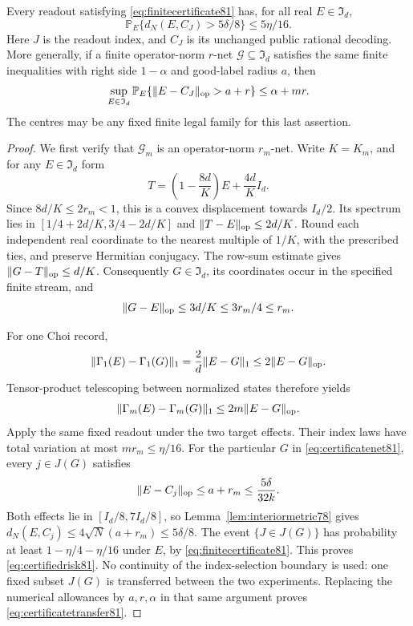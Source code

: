 \begin{theorem}
\label{thm:finitecertificate81}
Every readout satisfying \eqref{eq:finitecertificate81} has, for all
real $E\in\mathfrak I_d$,
\begin{equation}\label{eq:certifiedrisk81}
 \mathbb P_E\{d_N(E,C_J)>5\delta/8\}\le5\eta/16.
\end{equation}
Here $J$ is the readout index, and $C_J$ is its unchanged public
rational decoding.  More generally, if a finite operator-norm $r$-net
$\mathcal G\subseteq\mathfrak I_d$ satisfies the same finite inequalities with right side
$1-\alpha$ and good-label radius $a$, then
\begin{equation}\label{eq:certificatetransfer81}
 \sup_{E\in\mathfrak I_d}\mathbb P_E\{\|E-C_J\|_{\rm op}>a+r\}
 \le\alpha+mr.
\end{equation}
The centres may be any fixed finite legal family for this last assertion.
\end{theorem}
\begin{proof}
We first verify that $\mathcal G_m$ is an operator-norm $r_m$-net.
Write $K=K_m$, and for any $E\in\mathfrak I_d$ form
\[
 T=\left(1-\frac{8d}{K}\right)E+\frac{4d}{K}I_d.
\]
Since $8d/K\le2r_m<1$, this is a convex displacement towards
$I_d/2$.  Its spectrum lies in
$[1/4+2d/K,3/4-2d/K]$ and
$\|T-E\|_{\rm op}\le2d/K$.
Round each independent real coordinate to the nearest multiple of
$1/K$, with the prescribed ties, and preserve Hermitian conjugacy.
The row-sum estimate gives $\|G-T\|_{\rm op}\le d/K$.
Consequently $G\in\mathfrak I_d$, its coordinates occur in the
specified finite stream, and
\begin{equation}\label{eq:certificatenet81}
 \|G-E\|_{\rm op}\le3d/K\le3r_m/4\le r_m.
\end{equation}

For one Choi record,
\[
 \|\Gamma_1(E)-\Gamma_1(G)\|_1
   =\frac{2}{d}\|E-G\|_1\le2\|E-G\|_{\rm op}.
\]
Tensor-product telescoping between normalized states therefore yields
\begin{equation}\label{eq:recordlipschitz81}
 \|\Gamma_m(E)-\Gamma_m(G)\|_1
 \le2m\|E-G\|_{\rm op}.
\end{equation}
Apply the same fixed readout under the two target effects.
Their index laws have total variation at most $mr_m\le\eta/16$.
For the particular $G$ in \eqref{eq:certificatenet81}, every
$j\in J(G)$ satisfies
\[
 \|E-C_j\|_{\rm op}\le a+r_m
                  \le\frac{5\delta}{32k}.
\]
Both effects lie in $[I_d/8,7I_d/8]$, so
Lemma~\ref{lem:interiormetric78} gives
$d_N(E,C_j)\le4\sqrt N(a+r_m)\le5\delta/8$.
The event $\{J\in J(G)\}$ has probability at least
$1-\eta/4-\eta/16$ under $E$, by
\eqref{eq:finitecertificate81}.  This proves
\eqref{eq:certifiedrisk81}.  No continuity of the index-selection
boundary is used: one fixed subset $J(G)$ is transferred between the
two experiments.  Replacing the numerical allowances by $a,r,\alpha$
in that same argument proves \eqref{eq:certificatetransfer81}.
\end{proof}


